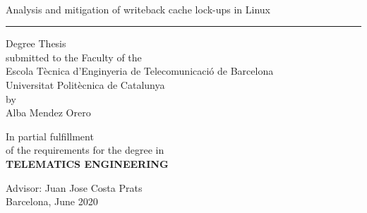 \documentclass[a4paper,12pt]{article}
\begin{document}

\thispagestyle{empty}
\begin{center}
{\sffamily 
{}\\
\vspace{1cm}
{\Huge Analysis and mitigation of writeback cache lock-ups in Linux}\\
\vspace{0.5cm}
{\color{black}\hrule height 1pt}
\vspace{1cm}
{\large{Degree Thesis \\
submitted to the Faculty of the \\
Escola Tècnica d'Enginyeria de Telecomunicació de Barcelona \\
Universitat Politècnica de Catalunya \\
by \\
\vspace{0.5cm}
Alba Mendez Orero}}

\vspace{1.5cm}

{In partial fulfillment \\
of the requirements for the degree in \\
\textbf{TELEMATICS ENGINEERING}}

\vspace{1.8cm}

{{Advisor: Juan Jose Costa Prats\\}}
{{Barcelona, June 2020}}

\vspace{2cm}

\thispagestyle{alim}
}

\end{center}
\end{document}
